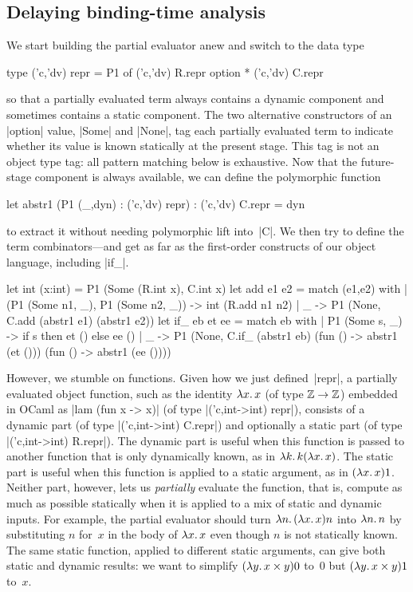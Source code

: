 \subsection{Delaying binding-time analysis}
\label{S:PE-problem}

We start building the partial evaluator anew and
switch to the data type
\begin{code}
type ('c,'dv) repr = P1 of ('c,'dv) R.repr option * ('c,'dv) C.repr
\end{code}
so that a partially evaluated term always contains a dynamic
component and sometimes contains a static component.
The two
alternative constructors of an |option| value, |Some| and |None|,
tag each partially evaluated term to indicate whether its value is
known statically at the present stage.
This tag is not an object type tag: all pattern matching below
is exhaustive. Now that the future-stage component is always available, we
can define the polymorphic function
\begin{code}
let abstr1 (P1 (_,dyn) : ('c,'dv) repr) : ('c,'dv) C.repr = dyn
\end{code}
to extract it without needing polymorphic lift into~|C|.  We then try
to define the term combinators\nobreak\hspace{0pt}---and get as far as
the first-order constructs of our object language, including |if_|.
\begin{code}
let int (x:int) = P1 (Some (R.int x), C.int x)
let add e1 e2 = match (e1,e2) with
  | (P1 (Some n1, _), P1 (Some n2, _)) -> int (R.add n1 n2)
  | _ -> P1 (None, C.add (abstr1 e1) (abstr1 e2))
let if_ eb et ee = match eb with
  | P1 (Some s, _) -> if s then et () else ee ()
  | _ -> P1 (None, C.if_ (abstr1 eb) (fun () -> abstr1 (et ()))
                                     (fun () -> abstr1 (ee ())))
\end{code}
However, we stumble on functions.  Given how we just
defined~|repr|, a partially evaluated object function, such as the
identity $\mathopen{\lambda\mathord{x}.\,}x$ (of type $\mathbb{Z}\to\mathbb{Z}$) embedded in OCaml as
|lam (fun x -> x)| (of type |('c,int->int) repr|), consists of
a dynamic part (of type |('c,int->int) C.repr|) and optionally
a static part (of type |('c,int->int) R.repr|).  The dynamic part is useful
when this function is passed to another function that is only
dynamically known, as in $\mathopen{\lambda\mathord{k}.\,}k(\mathopen{\lambda\mathord{x}.\,}x)$.  The static part is
useful when this function is applied to a static argument, as in
$(\mathopen{\lambda\mathord{x}.\,}x)1$.  Neither part, however, lets us \emph{partially}
evaluate the function, that is, compute as much as possible statically
when it is applied to a mix of static and dynamic inputs.  For example,
the partial evaluator should turn $\mathopen{\lambda\mathord{n}.\,}(\mathopen{\lambda\mathord{x}.\,}x)n$ into $\mathopen{\lambda\mathord{n}.\,}n$
by substituting $n$ for~$x$ in the body of $\mathopen{\lambda\mathord{x}.\,}x$ even though $n$ is
not statically known.  The same static function, applied to
different static arguments, can give both static and dynamic results: we
want to simplify $(\mathopen{\lambda\mathord{y}.\,}x\times y)0$ to~$0$ but $(\mathopen{\lambda\mathord{y}.\,}x\times y)1$
to~$x$.

